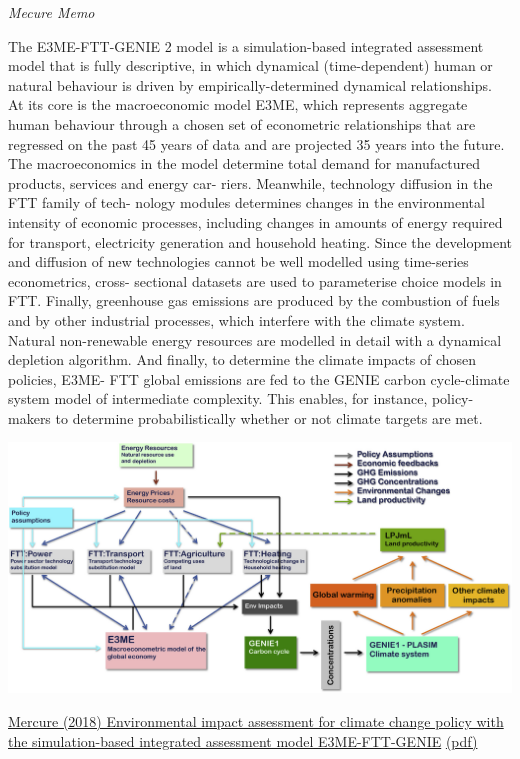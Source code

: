 \documentclass[
]{book}
\begin{document}
\emph{Mecure Memo}

The E3ME-FTT-GENIE 2 model is a simulation-based integrated
assessment model that is fully descriptive, in which dynamical
(time-dependent) human or natural behaviour is driven by
empirically-determined dynamical relationships. At its core is the
macroeconomic model E3ME, which represents aggregate human
behaviour through a chosen set of econometric relationships that
are regressed on the past 45 years of data and are projected 35
years into the future. The macroeconomics in the model determine
total demand for manufactured products, services and energy car-
riers. Meanwhile, technology diffusion in the FTT family of tech-
nology modules determines changes in the environmental
intensity of economic processes, including changes in amounts of
energy required for transport, electricity generation and household
heating. Since the development and diffusion of new technologies
cannot be well modelled using time-series econometrics, cross-
sectional datasets are used to parameterise choice models in FTT.
Finally, greenhouse gas emissions are produced by the combustion
of fuels and by other industrial processes, which interfere with the
climate system. Natural non-renewable energy resources are
modelled in detail with a dynamical depletion algorithm. And
ﬁnally, to determine the climate impacts of chosen policies, E3ME-
FTT global emissions are fed to the GENIE carbon cycle-climate
system model of intermediate complexity. This enables, for
instance, policy-makers to determine probabilistically whether or
not climate targets are met.

\includegraphics{fig/E3E-FTT-GENIE.png}

\href{https://www.sciencedirect.com/science/article/pii/S2211467X18300129?via\%3Dihub}{Mercure (2018) Environmental impact assessment for climate change policy with the simulation-based integrated assessment model E3ME-FTT-GENIE}
\href{pdf/Mercure_2018_E3ME-FTT-GENIE.pdf}{(pdf)}
\end{document}
